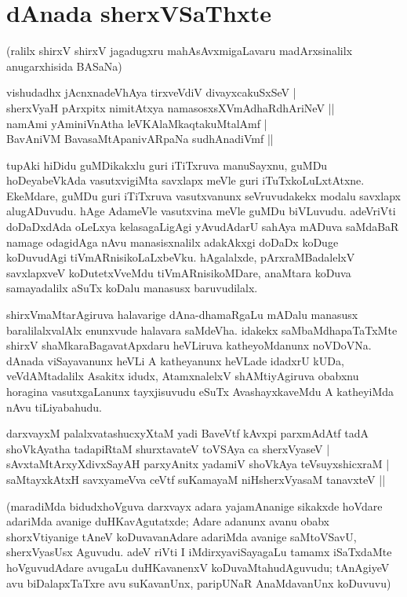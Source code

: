 \chapter{dAnada sherxVSaThxte}\label{chap14}

({}ralilx shirxV shirxV jagadugxru mahAsAvxmigaLavaru madArxsinalilx anugarxhisida BASaNa)

\begin{shloka}
vishudadhx jAcnxnadeVhAya tirxveVdiV divayxcakuSxSeV |\\
sherxVyaH pArxpitx nimitAtxya namasosxsXVmAdhaRdhAriNeV ||\\
namAmi yAminiVnAtha leVKAlaMkaqtakuMtalAmf |\\
BavAniVM BavasaMtApanivARpaNa sudhAnadiVmf ||
\end{shloka}

tupAki hiDidu guMDikakxlu guri iTiTxruva manuSayxnu, guMDu hoDeyabeVkAda vasutxvigiMta savxlapx meVle guri iTuTxkoLuLxtAtxne. EkeMdare, guMDu guri iTiTxruva vasutxvanunx seVruvudakekx modalu savxlapx alugADuvudu. hAge AdameVle vasutxvina meVle guMDu biVLuvudu. adeVriVti doDaDxdAda oLeLxya kelasagaLigAgi yAvudAdarU sahAya mADuva saMdaBaR namage odagidAga nAvu manasisxnalilx adakAkxgi doDaDx koDuge koDuvudAgi tiVmARnisikoLaLxbeVku. hAgalalxde, pArxraMBadalelxV savxlapxveV koDutetxVveMdu tiVmARnisikoMDare, anaMtara koDuva samayadalilx aSuTx koDalu manasusx baruvudilalx.

shirxVmaMtarAgiruva halavarige dAna-dhamaRgaLu mADalu manasusx baralilalxvalAlx enunxvude halavara saMdeVha. idakekx saMbaMdhapaTaTxMte shirxV shaMkaraBagavatApxdaru heVLiruva katheyoMdanunx noVDoVNa. dAnada viSayavanunx heVLi A katheyanunx heVLade idadxrU kUDa, veVdAMtadalilx Asakitx idudx, AtamxnalelxV shAMtiyAgiruva obabxnu horagina vasutxgaLanunx tayxjisuvudu eSuTx AvashayxkaveMdu A katheyiMda nAvu tiLiyabahudu.

\begin{shloka}
darxvayxM palalxvatashucxyXtaM yadi BaveVtf kAvxpi parxmAdAtf tadA\\
shoVkAyatha tadapiRtaM shurxtavateV toVSAya ca sherxVyaseV |\\
sAvxtaMtArxyXdivxSayAH parxyAnitx yadamiV shoVkAya teVsuyxshicxraM |\\
saMtayxkAtxH savxyameVva ceVtf suKamayaM niHsherxVyasaM tanavxteV ||
\end{shloka}

(maradiMda bidudxhoVguva darxvayx adara yajamAnanige sikakxde hoVdare adariMda avanige duHKavAgutatxde; Adare adanunx avanu obabx shorxVtiyanige tAneV koDuvavanAdare adariMda avanige saMtoVSavU, sherxVyasUsx Aguvudu. adeV riVti I iMdirxyaviSayagaLu tamamx iSaTxdaMte hoVguvudAdare avugaLu duHKavanenxV koDuvaMtahudAguvudu; tAnAgiyeV avu biDalapxTaTxre avu suKavanUnx, paripUNaR AnaMdavanUnx koDuvuvu)

